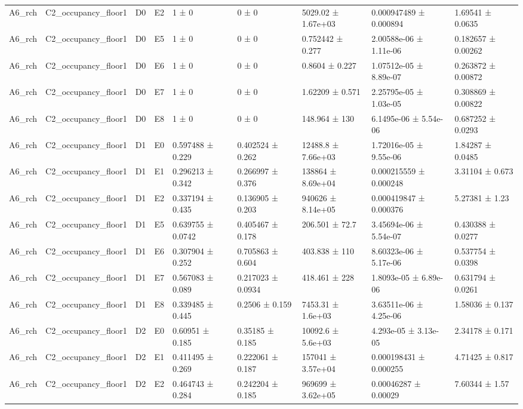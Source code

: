 \begin{table}
\begin{tabular}{lllllllll}
A6\_rch & C2\_occupancy\_floor1 & D0 & E2 & 1 ± 0 & 0 ± 0 & 5029.02 ± 1.67e+03 & 0.000947489 ± 0.000894 & 1.69541 ± 0.0635 \\
A6\_rch & C2\_occupancy\_floor1 & D0 & E5 & 1 ± 0 & 0 ± 0 & 0.752442 ± 0.277 & 2.00588e-06 ± 1.11e-06 & 0.182657 ± 0.00262 \\
A6\_rch & C2\_occupancy\_floor1 & D0 & E6 & 1 ± 0 & 0 ± 0 & 0.8604 ± 0.227 & 1.07512e-05 ± 8.89e-07 & 0.263872 ± 0.00872 \\
A6\_rch & C2\_occupancy\_floor1 & D0 & E7 & 1 ± 0 & 0 ± 0 & 1.62209 ± 0.571 & 2.25795e-05 ± 1.03e-05 & 0.308869 ± 0.00822 \\
A6\_rch & C2\_occupancy\_floor1 & D0 & E8 & 1 ± 0 & 0 ± 0 & 148.964 ± 130 & 6.1495e-06 ± 5.54e-06 & 0.687252 ± 0.0293 \\
A6\_rch & C2\_occupancy\_floor1 & D1 & E0 & 0.597488 ± 0.229 & 0.402524 ± 0.262 & 12488.8 ± 7.66e+03 & 1.72016e-05 ± 9.55e-06 & 1.84287 ± 0.0485 \\
A6\_rch & C2\_occupancy\_floor1 & D1 & E1 & 0.296213 ± 0.342 & 0.266997 ± 0.376 & 138864 ± 8.69e+04 & 0.000215559 ± 0.000248 & 3.31104 ± 0.673 \\
A6\_rch & C2\_occupancy\_floor1 & D1 & E2 & 0.337194 ± 0.435 & 0.136905 ± 0.203 & 940626 ± 8.14e+05 & 0.000419847 ± 0.000376 & 5.27381 ± 1.23 \\
A6\_rch & C2\_occupancy\_floor1 & D1 & E5 & 0.639755 ± 0.0742 & 0.405467 ± 0.178 & 206.501 ± 72.7 & 3.45694e-06 ± 5.54e-07 & 0.430388 ± 0.0277 \\
A6\_rch & C2\_occupancy\_floor1 & D1 & E6 & 0.307904 ± 0.252 & 0.705863 ± 0.604 & 403.838 ± 110 & 8.60323e-06 ± 5.17e-06 & 0.537754 ± 0.0398 \\
A6\_rch & C2\_occupancy\_floor1 & D1 & E7 & 0.567083 ± 0.089 & 0.217023 ± 0.0934 & 418.461 ± 228 & 1.8093e-05 ± 6.89e-06 & 0.631794 ± 0.0261 \\
A6\_rch & C2\_occupancy\_floor1 & D1 & E8 & 0.339485 ± 0.445 & 0.2506 ± 0.159 & 7453.31 ± 1.6e+03 & 3.63511e-06 ± 4.25e-06 & 1.58036 ± 0.137 \\
A6\_rch & C2\_occupancy\_floor1 & D2 & E0 & 0.60951 ± 0.185 & 0.35185 ± 0.185 & 10092.6 ± 5.6e+03 & 4.293e-05 ± 3.13e-05 & 2.34178 ± 0.171 \\
A6\_rch & C2\_occupancy\_floor1 & D2 & E1 & 0.411495 ± 0.269 & 0.222061 ± 0.187 & 157041 ± 3.57e+04 & 0.000198431 ± 0.000255 & 4.71425 ± 0.817 \\
A6\_rch & C2\_occupancy\_floor1 & D2 & E2 & 0.464743 ± 0.284 & 0.242204 ± 0.185 & 969699 ± 3.62e+05 & 0.00046287 ± 0.00029 & 7.60344 ± 1.57 \\

\end{tabular}
\end{table}
